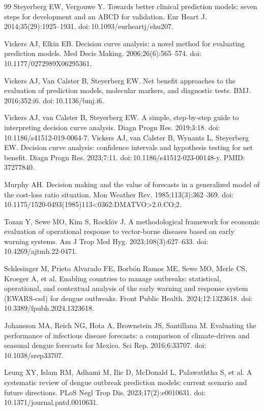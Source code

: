 \documentclass[11pt,a4paper]{article}
\begin{document}
\begin{thebibliography}{99}
 Steyerberg EW, Vergouwe Y. Towards better clinical prediction models: seven steps for development and an ABCD for validation. Eur Heart J. 2014;35(29):1925--1931. doi:\,10.1093/eurheartj/ehu207.

 Vickers AJ, Elkin EB. Decision curve analysis: a novel method for evaluating prediction models. Med Decis Making. 2006;26(6):565--574. doi:\,10.1177/0272989X06295361.

 Vickers AJ, Van Calster B, Steyerberg EW. Net benefit approaches to the evaluation of prediction models, molecular markers, and diagnostic tests. BMJ. 2016;352:i6. doi:\,10.1136/bmj.i6.

 Vickers AJ, van Calster B, Steyerberg EW. A simple, step-by-step guide to interpreting decision curve analysis. Diagn Progn Res. 2019;3:18. doi:\,10.1186/s41512-019-0064-7.
 Vickers AJ, van Calster B, Wynants L, Steyerberg EW. Decision curve analysis: confidence intervals and hypothesis testing for net benefit. Diagn Progn Res. 2023;7:11. doi:\,10.1186/s41512-023-00148-y. PMID:\,37277840.

 Murphy AH. Decision making and the value of forecasts in a generalized model of the cost-loss ratio situation. Mon Weather Rev. 1985;113(3):362--369. doi:\,10.1175/1520-0493(1985)113\textless0362:DMATVO\textgreater2.0.CO;2.

 Tozan Y, Sewe MO, Kim S, Rockl\"ov J. A methodological framework for economic evaluation of operational response to vector-borne diseases based on early warning systems. Am J Trop Med Hyg. 2023;108(3):627--633. doi:\,10.4269/ajtmh.22-0471.

 Schlesinger M, Prieto Alvarado FE, Borb\'on Ramos ME, Sewe MO, Merle CS, Kroeger A, et al. Enabling countries to manage outbreaks: statistical, operational, and contextual analysis of the early warning and response system (EWARS-csd) for dengue outbreaks. Front Public Health. 2024;12:1323618. doi:\,10.3389/fpubh.2024.1323618.

 Johansson MA, Reich NG, Hota A, Brownstein JS, Santillana M. Evaluating the performance of infectious disease forecasts: a comparison of climate-driven and seasonal dengue forecasts for Mexico. Sci Rep. 2016;6:33707. doi:\,10.1038/srep33707.

 Leung XY, Islam RM, Adhami M, Ilic D, McDonald L, Palawaththa S, et al. A systematic review of dengue outbreak prediction models: current scenario and future directions. PLoS Negl Trop Dis. 2023;17(2):e0010631. doi:\,10.1371/journal.pntd.0010631.


\end{thebibliography}
\end{document}
